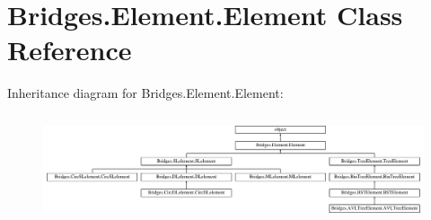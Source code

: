 \hypertarget{class_bridges_1_1_element_1_1_element}{}\section{Bridges.\+Element.\+Element Class Reference}
\label{class_bridges_1_1_element_1_1_element}
Inheritance diagram for Bridges.\+Element.\+Element\+:\begin{figure}[H]
\begin{center}
\leavevmode
\includegraphics[height=3.218391cm]{class_bridges_1_1_element_1_1_element}
\end{center}
\end{figure}
